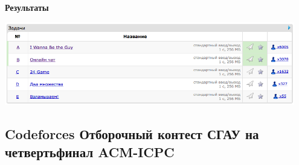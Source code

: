 \documentclass[a4paper,12pt]{article}
\begin{document}
\textbf{{\large Результаты}} \\
\begin{center}
\includegraphics[width=0.95\textwidth]{C_268/C_268_result.png}\\ [1cm]
\end{center}



%
%

\newpage
\subsection{Codeforces Отборочный контест СГАУ на четвертьфинал ACM-ICPC}
\end{document}
